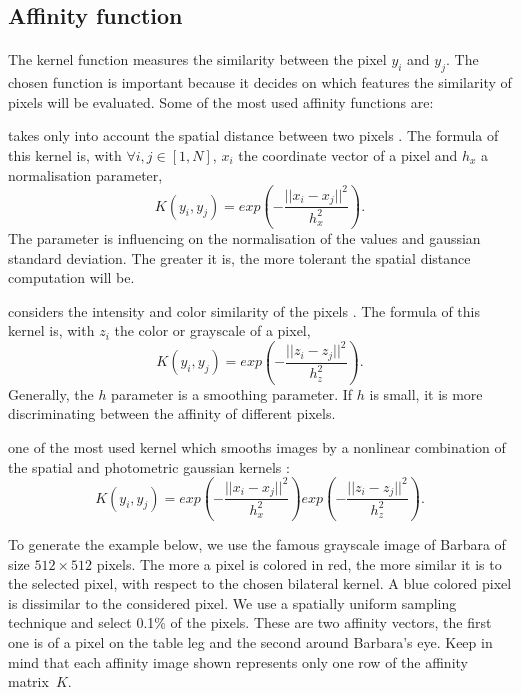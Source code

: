 \subsection{Affinity function}

\paragraph{}
The kernel function measures the similarity between the pixel \(y_i\) and \(y_j\).
The chosen function is important because it decides on which features the similarity of pixels will be evaluated.
Some of the most used affinity functions are:

\begin{description}[align=left]
 \item [Spatial Gaussian Kernel] takes only into account the spatial distance between two pixels \cite{siam_slides_2016}.
  The formula of this kernel is, with \(\forall i, j \in [1, N]\), \(x_i\) the coordinate vector of a pixel and \(h_x\) a normalisation parameter,
  \[K(y_i, y_j) = exp(-\frac{||x_i - x_j||^2}{h_x^2}).\]
  The parameter is influencing on the normalisation of the values and gaussian standard deviation.
  The greater it is, the more tolerant the spatial distance computation will be.

 \item [Photometric Gaussian Kernel] considers the intensity and color similarity of the pixels \cite{siam_slides_2016}.
  The formula of this kernel is, with \(z_i\) the color or grayscale of a pixel,
  \[K(y_i, y_j) = exp(-\frac{||z_i - z_j||^2}{h_z^2}).\]
  Generally, the \(h\) parameter is a smoothing parameter.
  If \(h\) is small, it is more discriminating between the affinity of different pixels.

 \item [Bilateral Kernel] one of the most used kernel which smooths images by a nonlinear combination of the spatial and photometric gaussian kernels \cite{siam_slides_2016} \cite{glide_2014} \cite{bilateral_tomasi_1998}:
  \[K(y_i, y_j) = exp(-\frac{||x_i - x_j||^2}{h_x^2}) exp(-\frac{||z_i - z_j||^2}{h_z^2}).\]

  To generate the example below, we use the famous grayscale image of Barbara of size \(512 \times 512\) pixels.
  The more a pixel is colored in red, the more similar it is to the selected pixel, with respect to the chosen bilateral kernel.
  A blue colored pixel is dissimilar to the considered pixel.
  We use a spatially uniform sampling technique and select 0.1\% of the pixels.
  These are two affinity vectors, the first one is of a pixel on the table leg and the second around Barbara's eye.
  Keep in mind that each affinity image shown represents only one row of the affinity matrix\ \(K\).


\end{description}
